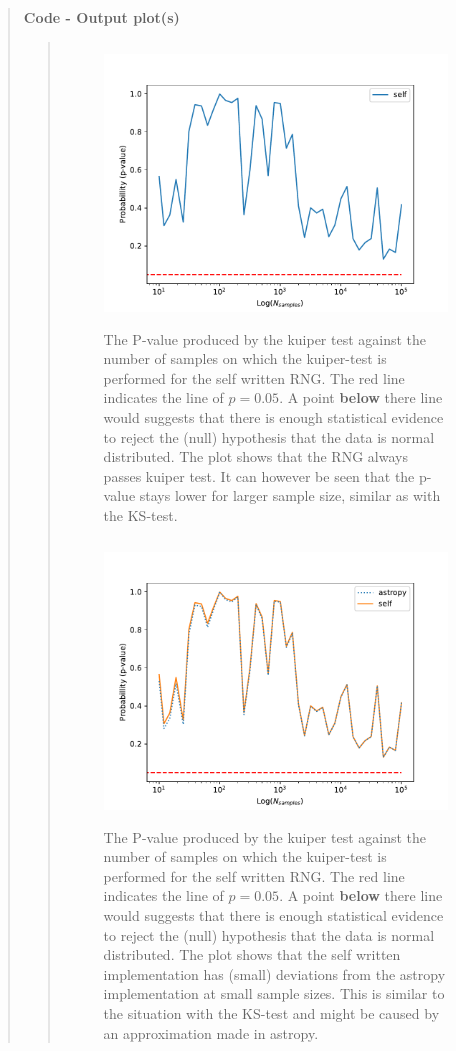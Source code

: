 \begin{quote}
\textbf{Code - Output plot(s)}
\begin{quote}
\begin{figure}[!ht]
\centering
\includegraphics[width=12cm, height=7.5cm]{./Plots/1_plot_kuiper_test_self.pdf}
\caption{The P-value produced by the kuiper test against the number of samples on which the kuiper-test is performed for the self written RNG. The red line indicates the line of $ p = 0.05$. A point \textbf{below} there  line would suggests that there is enough statistical evidence to reject the (null) hypothesis that the data is normal distributed. The plot shows that the RNG always passes kuiper test. It can however be seen that the p-value stays lower for larger sample size, similar as with the KS-test.}
\end{figure}
\newpage
\begin{figure}[!hb]
\centering
\includegraphics[width=12cm, height=7.5cm]{./Plots/1_plot_kuiper_test_self_astropy.pdf}
\caption{The P-value produced by the kuiper test against the number of samples on which the kuiper-test is performed for the self written RNG. The red line indicates the line of $ p = 0.05$. A point \textbf{below} there  line would suggests that there is enough statistical evidence to reject the (null) hypothesis that the data is normal distributed. The plot shows that the self written implementation has (small) deviations from the astropy implementation at small sample sizes. This is similar to the situation with the KS-test and might be caused by an approximation made in astropy.   }
\end{figure}

\end{quote}
\end{quote}














